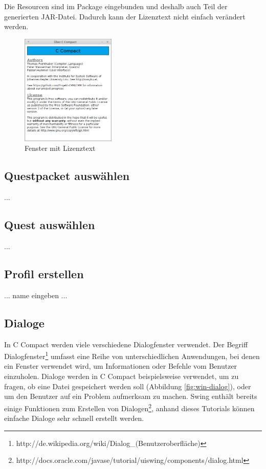 Die Resourcen sind im Package eingebunden und deshalb auch Teil der generierten JAR-Datei. Dadurch kann der Lizenztext nicht einfach verändert werden.

\begin{figure}[htp]
\centering
\includegraphics[width=0.4\textwidth]{./media/images/gui/elements/Bildschirmfoto-About.png}
\caption{Fenster mit Lizenztext}
\label{fig:win-about}
\end{figure}

\subsection{Questpacket auswählen}
...

\subsection{Quest auswählen}
...

\subsection{Profil erstellen}
... name eingeben ...

\subsection{Dialoge}
\label{sec:win-dialog}
In C Compact werden viele verschiedene Dialogfenster verwendet. Der Begriff Dialogfenster\footnote{http://de.wikipedia.org/wiki/Dialog\_(Benutzeroberfläche)} umfasst eine Reihe von unterschiedlichen Anwendungen, bei denen ein Fenster verwendet wird, um Informationen oder Befehle vom Benutzer einzuholen. Dialoge werden in C Compact beispielsweise verwendet, um zu fragen, ob eine Datei gespeichert werden soll (Abbildung \ref{fig:win-dialog}), oder um den Benutzer auf ein Problem aufmerksam zu machen. Swing enthält bereits einige Funktionen zum Erstellen von Dialogen\footnote{http://docs.oracle.com/javase/tutorial/uiswing/components/dialog.html}, anhand dieses Tutorials können einfache Dialoge sehr schnell erstellt werden.


